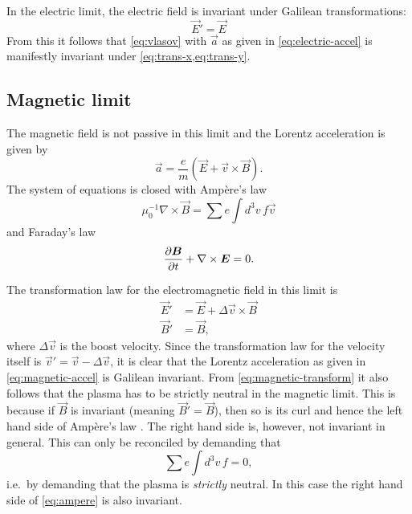 \documentclass[aps,pre,notitlepage,amsmath,amssymb,amsfonts,nobibnotes,nofootinbib,superscriptaddress,onecolumn,a4paper,10pt]{revtex4-1}
\begin{document}
In the electric limit, the electric field is invariant under Galilean
transformations:
\begin{equation}
  \vec{E}' = \vec{E}
\end{equation}
From this it follows that \cref{eq:vlasov} with $\vec{a}$ as given in
\cref{eq:electric-accel} is manifestly invariant under
\cref{eq:trans-x,eq:trans-y}.

\subsection{Magnetic limit}\label{sec:magnetic}

The magnetic field is not passive in this limit and the Lorentz acceleration
is given by
\begin{equation}
  \label{eq:magnetic-accel}
  \vec{a} = \frac{e}{m}(\vec{E} + \vec{v}\times\vec{B}).
\end{equation}
The system of equations is closed with Ampère's law
\begin{equation}
  \label{eq:ampere}
  \mu_0^{-1}\nabla\times\vec{B} = \sum e\int\!d^3v\,f\vec{v}
\end{equation}
and Faraday's law
\begin{equation}
  \label{eq:faraday}
  \frac{\partial\bm{B}}{\partial t} + \nabla\times\bm{E} = 0.
\end{equation}

The transformation law for the electromagnetic field in this limit is
\begin{equation}
  \label{eq:magnetic-transform}
  \begin{aligned}
    \vec{E}' &= \vec{E} + \Delta\vec{v}\times\vec{B} \\
    \vec{B}' &= \vec{B},
  \end{aligned}
\end{equation}
where $\Delta\vec{v}$ is the boost velocity. Since the transformation law for
the velocity itself is $\vec{v}'=\vec{v}-\Delta\vec{v}$, it is clear that the
Lorentz acceleration as given in \cref{eq:magnetic-accel} is Galilean
invariant. From \cref{eq:magnetic-transform} it also follows that the plasma
has to be strictly neutral in the magnetic limit. This is because if $\vec{B}$
is invariant (meaning $\vec{B}'=\vec{B}$), then so is its curl and hence the
left hand side of Ampère's law . The right hand side is,
however, not invariant in general. This can only be reconciled by demanding
that
\begin{equation}
  \label{eq:strict-neutrality}
  \sum e\int\!d^3v\,f = 0,
\end{equation}
i.e.\ by demanding that the plasma is \emph{strictly} neutral. In this case
the right hand side of \cref{eq:ampere} is also invariant.
\end{document}
